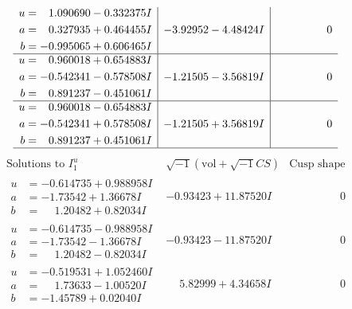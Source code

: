 \documentclass[1p]{elsarticle_modified}
\theoremstyle{definition}
\newcommand{\I}{\sqrt{-1}}
\begin{document}
$$\begin{array}{c|c|c}
\begin{aligned}
u &= \phantom{-}1.090690 - 0.332375 I \\
a &= \phantom{-}0.327935 + 0.464455 I \\
b &= -0.995065 + 0.606465 I\end{aligned}
 & -3.92952 - 4.48424 I & \phantom{-0.000000 } 0 \\ \hline\begin{aligned}
u &= \phantom{-}0.960018 + 0.654883 I \\
a &= -0.542341 - 0.578508 I \\
b &= \phantom{-}0.891237 - 0.451061 I\end{aligned}
 & -1.21505 - 3.56819 I & \phantom{-0.000000 } 0 \\ \hline\begin{aligned}
u &= \phantom{-}0.960018 - 0.654883 I \\
a &= -0.542341 + 0.578508 I \\
b &= \phantom{-}0.891237 + 0.451061 I\end{aligned}
 & -1.21505 + 3.56819 I & \phantom{-0.000000 } 0\\
 \hline 
 \end{array}$$\newpage$$\begin{array}{c|c|c}  
\text{Solutions to }I^u_{1}& \I (\text{vol} + \sqrt{-1}CS) & \text{Cusp shape}\\
 \hline 
\begin{aligned}
u &= -0.614735 + 0.988958 I \\
a &= -1.73542 + 1.36678 I \\
b &= \phantom{-}1.20482 + 0.82034 I\end{aligned}
 & -0.93423 + 11.87520 I & \phantom{-0.000000 } 0 \\ \hline\begin{aligned}
u &= -0.614735 - 0.988958 I \\
a &= -1.73542 - 1.36678 I \\
b &= \phantom{-}1.20482 - 0.82034 I\end{aligned}
 & -0.93423 - 11.87520 I & \phantom{-0.000000 } 0 \\ \hline\begin{aligned}
u &= -0.519531 + 1.052460 I \\
a &= \phantom{-}1.73633 - 1.00520 I \\
b &= -1.45789 + 0.02040 I\end{aligned}
 & \phantom{-}5.82999 + 4.34658 I & \phantom{-0.000000 } 0 \\ \hline\begin{aligned}

\end{aligned}
\end{array}$$
\end{document}
